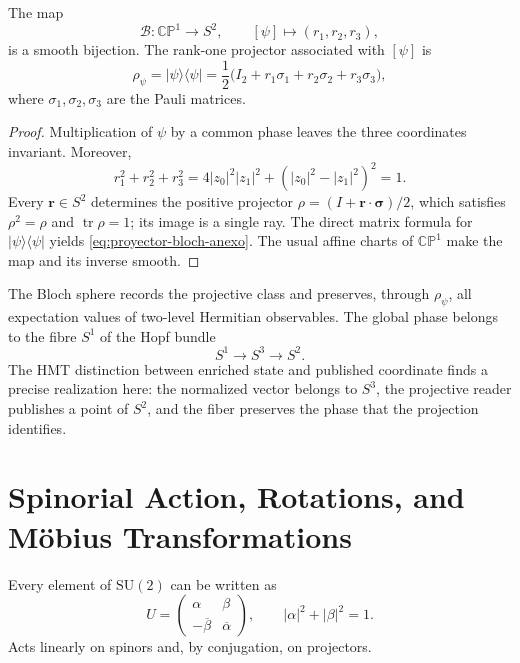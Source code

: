 \begin{theorem}
\label{thm:CP1-esfera-bloch-anexo}
The map
\begin{equation}
 \mathcal B:\mathbb{CP}^{1}\longrightarrow S^2,
 \qquad [\psi]\longmapsto(r_1,r_2,r_3),
 \label{eq:mapa-bloch-anexo}
\end{equation}
is a smooth bijection. The rank-one projector associated with \([\psi]\) is
\begin{equation}
 \rho_\psi=|\psi\rangle\langle\psi|
 =\frac12\bigl(I_2+r_1\sigma_1+r_2\sigma_2+r_3\sigma_3\bigr),
 \label{eq:proyector-bloch-anexo}
\end{equation}
where \(\sigma_1,\sigma_2,\sigma_3\) are the Pauli matrices.
\end{theorem}

\begin{proof}
Multiplication of \(\psi\) by a common phase leaves the three
coordinates invariant. Moreover,
\[
 r_1^2+r_2^2+r_3^2
 =4|z_0|^2|z_1|^2+(|z_0|^2-|z_1|^2)^2=1.
\]
Every \(\boldsymbol r\in S^2\) determines the positive projector \(\rho=(I+\boldsymbol r\cdot\boldsymbol\sigma)/2\), which
satisfies \(\rho^2=\rho\) and \(\operatorname{tr}\rho=1\); its image is a single ray. The
direct matrix formula for \(|\psi\rangle\langle\psi|\) yields \eqref{eq:proyector-bloch-anexo}. The usual affine
charts of \(\mathbb{CP}^{1}\) make the map and its inverse smooth.
\end{proof}

The Bloch sphere records the projective class and preserves, through
\(\rho_\psi\), all expectation values of two-level Hermitian observables.
The global phase belongs to the fibre \(S^1\) of the Hopf bundle
\cite{Hopf1931}
\begin{equation}
 S^1\longrightarrow S^3\longrightarrow S^2.
 \label{eq:hopf-bloch-anexo}
\end{equation}
The HMT distinction between enriched state and published coordinate finds
a precise realization here: the normalized vector belongs to \(S^3\), the
projective reader publishes a point of \(S^2\), and the fiber preserves the phase that
the projection identifies.

\section{Spinorial Action, Rotations, and Möbius Transformations}

Every element of \(\mathrm{SU}(2)\) can be written as
\begin{equation}
 U=
 \begin{pmatrix}
 \alpha&\beta\\
 -\overline\beta&\overline\alpha
 \end{pmatrix},
 \qquad |\alpha|^2+|\beta|^2=1.
 \label{eq:SU2-parametrizacion-anexo}
\end{equation}
Acts linearly on spinors and, by conjugation, on projectors.

